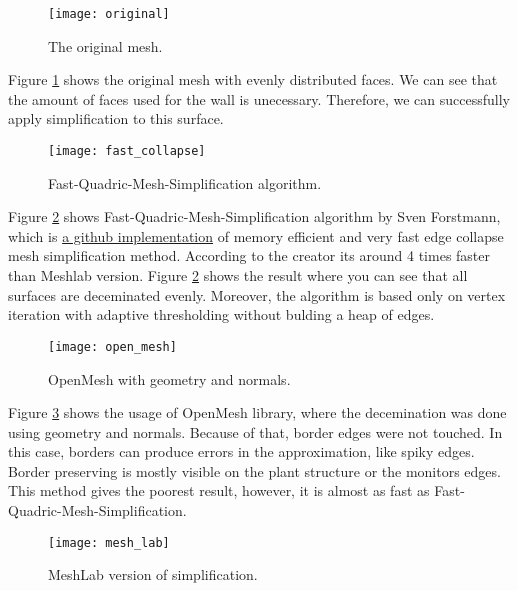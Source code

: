 \begin{figure}[H]
  \begin{center}
    \texttt{[image: original]}
    \caption{The original mesh.}
    \label{fig:original}
  \end{center}
\end{figure}

Figure \ref{fig:original} shows the original mesh with evenly distributed faces. We can see that the amount of faces used for the wall is unecessary. Therefore, we can successfully apply simplification to this surface.

\begin{figure}[H]
  \begin{center}
    \texttt{[image: fast\_collapse]}
    \caption{Fast-Quadric-Mesh-Simplification algorithm.}
    \label{fig:fast_collapse}
  \end{center}
\end{figure}

Figure \ref{fig:fast_collapse} shows Fast-Quadric-Mesh-Simplification algorithm by Sven Forstmann, which is \href{https://github.com/sp4cerat/Fast-Quadric-Mesh-Simplification}{a github implementation} of memory efficient and very fast edge collapse mesh simplification method. According to the creator its around 4 times faster than Meshlab version. Figure \ref{fig:fast_collapse} shows the result where you can see that all surfaces are deceminated evenly. Moreover, the algorithm is based only on vertex iteration with adaptive thresholding without bulding a heap of edges.

\begin{figure}[H]
  \begin{center}
    \texttt{[image: open\_mesh]}
    \caption{OpenMesh with geometry and normals.}
    \label{fig:open_mesh}
  \end{center}
\end{figure}

Figure \ref{fig:open_mesh} shows the usage of OpenMesh library, where the decemination was done using geometry and normals. Because of that, border edges were not touched. In this case, borders can produce errors in the approximation, like spiky edges. Border preserving is mostly visible on the plant structure or the monitors edges. This method gives the poorest result, however, it is almost as fast as Fast-Quadric-Mesh-Simplification.

\begin{figure}[H]
  \begin{center}
    \texttt{[image: mesh\_lab]}
    \caption{MeshLab version of simplification.}
    \label{fig:mesh_lab}
  \end{center}
\end{figure}

